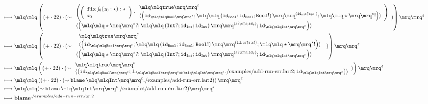 \documentclass{article}
\begin{document}
\begin{align*}
\longmapsto &\;\quot{\left(\left(+\cdot 22\right)\cdot (\sim \begin{array}{l}\left(\left(\begin{array}{l} \mathtt{fix}\; \mathit{f}_{0}(\mathit{x}_{0}:\star): \star\\\mathit{x}_{0}\end{array}\right)\cdot \begin{array}{l}\quot{\mathtt{true}}^{\varepsilon}\\\langle\left(\mathtt{id}_{\quot{\mathtt{Bool}}^{\varepsilon}};\quot{\left(\mathtt{id}_{\mathtt{Bool}};\mathtt{id}_{\mathtt{Bool}};\mathtt{Bool}!\right)}^{\left(\mathtt{id}_{\varepsilon};\varepsilon \uparrow \varepsilon;\varepsilon!\right)};\quot{\star}^{\star}!\right)\rangle\end{array}\right)\\\langle\left(\quot{\star}^{\star}?;\quot{\left(\mathtt{Int}?;\mathtt{id}_{\mathtt{Int}};\mathtt{id}_{\mathtt{Int}}\right)}^{\left(\varepsilon?;\varepsilon \uparrow \varepsilon;\mathtt{id}_{\varepsilon}\right)};\mathtt{id}_{\quot{\mathtt{Int}}^{\varepsilon}}\right)\rangle\end{array})\right)}^{\varepsilon}\\ 
\longmapsto &\;\quot{\left(\left(+\cdot 22\right)\cdot (\sim \begin{array}{l}\begin{array}{l}\quot{\mathtt{true}}^{\varepsilon}\\\langle\left(\mathtt{id}_{\quot{\mathtt{Bool}}^{\varepsilon}};\quot{\left(\mathtt{id}_{\mathtt{Bool}};\mathtt{id}_{\mathtt{Bool}};\mathtt{Bool}!\right)}^{\left(\mathtt{id}_{\varepsilon};\varepsilon \uparrow \varepsilon;\varepsilon!\right)};\quot{\star}^{\star}!\right)\rangle\end{array}\\\langle\left(\quot{\star}^{\star}?;\quot{\left(\mathtt{Int}?;\mathtt{id}_{\mathtt{Int}};\mathtt{id}_{\mathtt{Int}}\right)}^{\left(\varepsilon?;\varepsilon \uparrow \varepsilon;\mathtt{id}_{\varepsilon}\right)};\mathtt{id}_{\quot{\mathtt{Int}}^{\varepsilon}}\right)\rangle\end{array})\right)}^{\varepsilon}\\ 
\longmapsto &\;\quot{\left(\left(+\cdot 22\right)\cdot (\sim \begin{array}{l}\quot{\mathtt{true}}^{\varepsilon}\\\langle\left(\mathtt{id}_{\quot{\mathtt{Bool}}^{\varepsilon}};\bot_{\quot{\mathtt{Bool}}^{\varepsilon}\Rightarrow\quot{\mathtt{Int}}^{\varepsilon}}\text{./examples/add-run-err.lar:2};\mathtt{id}_{\quot{\mathtt{Int}}^{\varepsilon}}\right)\rangle\end{array})\right)}^{\varepsilon}\\ 
\longmapsto &\;\quot{\left(\left(+\cdot 22\right)\cdot (\sim \mathtt{blame}\,\quot{\mathtt{Int}}^{\varepsilon} \text{./examples/add-run-err.lar:2})\right)}^{\varepsilon}\\ 
\longmapsto &\;\quot{(\sim \mathtt{blame}\,\quot{\mathtt{Int}}^{\varepsilon} \text{./examples/add-run-err.lar:2})}^{\varepsilon}\\ 
\longmapsto &\;\mathbf{blame}^{./examples/add-run-err.lar:2}\end{align*}
\end{document}

